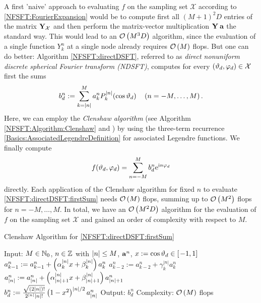 A first 'naive' approach to evaluating $f$ on the sampling set $\mathcal{X}$ according to \eqref{NFSFT:FourierExpansion} would be to compute first all $(M+1)^2D$
entries of the matrix $\mathbf{Y}_{\mathcal{X}}$ and then perform the matrix-vector multiplication $\mathbf{Y} \: \mathbf{a}$ the standard way. This would lead to an $\mathcal{O}\left(M^3D\right)$ algorithm, since the evaluation of a single function 
$Y_{k}^n$ at a single node already requires $\mathcal{O}\left(M\right)$ flops.
But one can do better: Algorithm \ref{NFSFT:directDSFT}, referred 
to as \emph{direct nonuniform discrete spherical Fourier transform (NDSFT)}, computes 
for every $\left(\vartheta_{d},\varphi_{d}\right) \in \mathcal{X}$ first the sums 
\begin{equation}
  \label{NFSFT:directDSFT:firstSum}
  b^{n}_{d} := \sum_{k=\left\vert n\right\vert}^M a_{k}^n P_{k}^{\left\vert n\right\vert}{\hspace{-0.4ex}}\left(\cos\vartheta_{d}\right) \quad \left(n=-M,\ldots,M\right). 
\end{equation}
Here, we can employ the \emph{Clenshaw algorithm} (see Algorithm \ref{NFSFT:Algorithm:Clenshaw} and \cite{prtevefl}) 
by using the three-term recurrence \eqref{Basics:AssociatedLegendreDefinition}
for associated Legendre functions. We finally compute
\begin{equation}
  \label{NFSFT:directNDSFT:secondSum}
  f{\hspace{-0.4ex}}\left(\vartheta_{d},\varphi_{d}\right) = \sum_{n=-M}^M b^{n}_d \mbox{\rm{e}}^{\mbox{\scriptsize\rm{i}} n \varphi_{d}}
\end{equation}
directly. Each application of the Clenshaw algorithm for fixed $n$ to evaluate \eqref{NFSFT:directDSFT:firstSum} needs $\mathcal{O}\left(M\right)$ 
flops, summing up to $\mathcal{O}\left(M^2\right)$ flops for $n = -M,\ldots,M$. In 
total, we have an $\mathcal{O}\left(M^2 D\right)$ algorithm for the evaluation of $f$ on the sampling set $\mathcal{X}$ and gained an order of complexity with respect to $M$. 
\begin{algorithm}[tb]
  \caption{Clenshaw Algorithm for \eqref{NFSFT:directDSFT:firstSum}}
  \label{NFSFT:Algorithm:Clenshaw}    
  \begin{algorithmic}
    \STATE  Input: $M \in \mathbb{N}_{0}$, $n \in \mathbb{Z}$ with $\left\vert n\right\vert \le M$, $\mathbf{a}^n$, $x := \cos\vartheta_{d} \in \left[\left.-1,1\right]\right.$
    \STATE
      \STATE $a_{k-1}^n := a_{k-1}^n + \left(\alpha_{k}^{|n|} x + \beta_{k}^{|n|}\right) a_{k}^n$
      \STATE $a_{k-2}^n := a_{k-2}^n + \gamma_{k}^{|n|} a_{k}^n$
    \ENDFOR
    \STATE $a_{\left\vert n\right\vert}^n := a_{\left\vert n\right\vert}^n + \left(\alpha_{\left\vert n\right\vert+1}^{|n|} x + \beta_{\left\vert n\right\vert+1}^{|n|}\right) a_{\left\vert n\right\vert+1}^n$\\[0.5ex]
    \STATE $b_{d}^n := \frac{\sqrt{(2|n|)!}}{2^{|n|} |n|!} \left(1-x^2\right)^{|n|/2} a_{\left\vert n\right\vert}^n$
    \STATE
    \STATE Output: $b_{d}^n$
    \STATE Complexity: $\mathcal{O}\left(M\right)$ flops
\end{algorithmic}
\end{algorithm}
